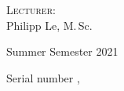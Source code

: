 \begin{titlepage}
\begin{center}
		\vspace{0.75cm}

		\normalsize
		\textsc{Lecturer:} \\
		Philipp Le, M.\,Sc.
		
		\vspace{0.75cm}
		
		\normalsize
		Summer Semester 2021
	\end{center}

	\vfill
	
	\begin{flushright}
		\footnotesize
		Serial number \VcsCommitNo, \VcsCommitDate
	\end{flushright}
\end{titlepage}
